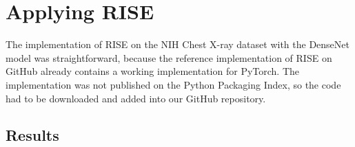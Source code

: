\section{Applying RISE}

The implementation of RISE on the NIH Chest X-ray dataset with the DenseNet model was straightforward, because the reference implementation of RISE on GitHub \cite{risegithub} already contains a working implementation for PyTorch. The implementation was not published on the Python Packaging Index, so the code had to be downloaded and added into our GitHub repository.

\subsection{Results}

